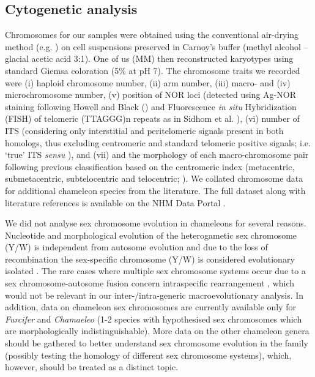 \documentclass[a4paper, 12pt]{article}
\begin{document}
\subsection{Cytogenetic analysis}
Chromosomes for our samples were obtained using the conventional air-drying method (e.g. \citealt{sidhom2020karyological}) on cell suspensions preserved in Carnoy’s buffer (methyl alcohol – glacial acetic acid 3:1). 
One of us (MM) then reconstructed karyotypes using standard Giemsa coloration (5\% at pH 7). 
The chromosome traits we recorded were (i) haploid chromosome number, (ii) arm number, (iii) macro- and (iv) microchromosome number, (v) position of NOR loci (detected using Ag-NOR staining following Howell and Black (\citeyear{howell1980controlled}) and Fluorescence \textit{in situ} Hybridization (FISH) of telomeric (TTAGGG)n repeats as in Sidhom et al. \citeyear{sidhom2020karyological}), (vi) number of ITS (considering only interstitial and peritelomeric signals present in both homologs, thus excluding centromeric and standard telomeric positive signals; i.e. `true' ITS \textit{sensu} \citealt{bolzan2012chromosomal,chirino2017chromosomal}), and (vii) and the morphology of each macro-chromosome pair following previous classification based on the centromeric index (metacentric, submetacentric, subtelocentric and telocentric; \citealt{levan1964nomenclature}). 
We collated chromosome data for additional chameleon species from the literature. 
The full dataset along with literature references is available on the NHM Data Portal \citep{chameleon-data}.

We did not analyse sex chromosome evolution in chameleons for several reasons. 
Nucleotide and morphological evolution of the heterogametic sex chromosome (Y/W) is independent from autosome evolution and due to the loss of recombination the sex-specific chromosome (Y/W) is considered evolutionary isolated \citep[see e.g.][]{ezaz2014repetitive,mezzasalma2021lizards}. 
The rare cases where multiple sex chromosome systems occur due to a sex chromosome-autosome fusion concern intraspecific rearrangement \citep[as in the case of the neo-sex chromosomes in \textit{Furcifer} reported by][]{rovatsos2015female,rovatsos2017evolution,rovatsos2019zz}, which would not be relevant in our inter-/intra-generic macroevolutionary analysis. 
In addition, data on chameleon sex chromosomes are currently available only for \textit{Furcifer} \citep{rovatsos2015female,rovatsos2017evolution,rovatsos2019zz} and \textit{Chamaeleo} \citep{sidhom2020karyological,tishakova2022identification} (1-2 species with hypothesised sex chromosomes which are morphologically indistinguishable). 
More data on the other chameleon genera should be gathered to better understand sex chromosome evolution in the family (possibly testing the homology of different sex chromosome systems), which, however, should be treated as a distinct topic.
\end{document}
